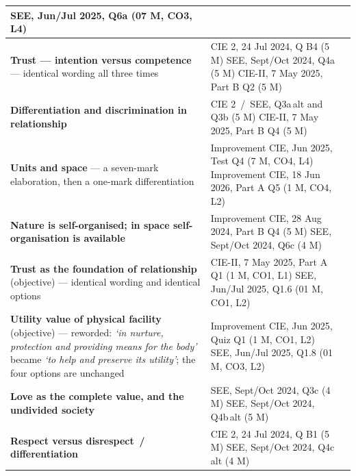 \begin{longtable}{P{58mm} P{80mm} C{14mm}}
  SEE, Jun/Jul 2025, Q6a (07 M, CO3, L4) &
   \\ \hline
\textbf{Trust --- intention versus competence} --- identical wording all
  three times &
  CIE 2, 24 Jul 2024, Q B4 (5 M)\newline
  SEE, Sept/Oct 2024, Q4a (5 M)\newline
  CIE-II, 7 May 2025, Part B Q2 (5 M) &
   \\ \hline
\textbf{Differentiation and discrimination in relationship} &
  CIE 2 \,/\, SEE, Q3a\,alt and Q3b (5 M)\newline
  CIE-II, 7 May 2025, Part B Q4 (5 M) &
   \\ \hline
\textbf{Units and space} --- a seven-mark elaboration, then a one-mark
  differentiation &
  Improvement CIE, Jun 2025, Test Q4 (7 M, CO4, L4)\newline
  Improvement CIE, 18 Jun 2026, Part A Q5 (1 M, CO4, L2) &
  \newline{} \\ \hline
\textbf{Nature is self-organised; in space self-organisation is available} &
  Improvement CIE, 28 Aug 2024, Part B Q4 (5 M)\newline
  SEE, Sept/Oct 2024, Q6c (4 M) &
   \\ \hline
\textbf{Trust as the foundation of relationship} (objective) --- identical
  wording and identical options &
  CIE-II, 7 May 2025, Part A Q1 (1 M, CO1, L1)\newline
  SEE, Jun/Jul 2025, Q1.6 (01 M, CO1, L2) &
  \newline{} \\ \hline
\textbf{Utility value of physical facility} (objective) --- reworded:
  \emph{`in nurture, protection and providing means for the body'} became
  \emph{`to help and preserve its utility'}; the four options are unchanged &
  Improvement CIE, Jun 2025, Quiz Q1 (1 M, CO1, L2)\newline
  SEE, Jun/Jul 2025, Q1.8 (01 M, CO3, L2) &
  \newline{} \\ \hline
\textbf{Love as the complete value, and the undivided society} &
  SEE, Sept/Oct 2024, Q3c (4 M)\newline
  SEE, Sept/Oct 2024, Q4b\,alt (5 M) &
   \\ \hline
\textbf{Respect versus disrespect \,/\, differentiation} &
  CIE 2, 24 Jul 2024, Q B1 (5 M)\newline
  SEE, Sept/Oct 2024, Q4c\,alt (4 M) &
   \\ \hline
\end{longtable}

